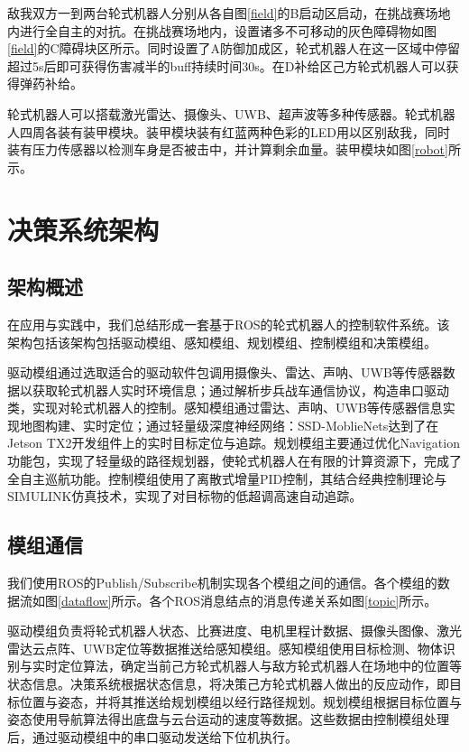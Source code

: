 敌我双方一到两台轮式机器人分别从各自图\ref{field}的B启动区启动，在挑战赛场地内进行全自主的对抗。在挑战赛场地内，设置诸多不可移动的灰色障碍物如图\ref{field}的C障碍块区所示。同时设置了A防御加成区，轮式机器人在这一区域中停留超过5s后即可获得伤害减半的buff持续时间30s。在D补给区己方轮式机器人可以获得弹药补给。

轮式机器人可以搭载激光雷达、摄像头、UWB、超声波等多种传感器。轮式机器人四周各装有装甲模块。装甲模块装有红蓝两种色彩的LED用以区别敌我，同时装有压力传感器以检测车身是否被击中，并计算剩余血量。装甲模块如图\ref{robot}所示。

\section{决策系统架构}
\subsection{架构概述}\label{system}
在应用与实践中，我们总结形成一套基于ROS的轮式机器人的控制软件系统。该架构包括该架构包括驱动模组、感知模组、规划模组、控制模组和决策模组。

驱动模组通过选取适合的驱动软件包调用摄像头、雷达、声呐、UWB等传感器数据以获取轮式机器人实时环境信息；通过解析步兵战车通信协议，构造串口驱动类，实现对轮式机器人的控制。感知模组通过雷达、声呐、UWB等传感器信息实现地图构建、实时定位；通过轻量级深度神经网络：SSD-MoblieNets达到了在Jetson TX2开发组件上的实时目标定位与追踪。规划模组主要通过优化Navigation功能包，实现了轻量级的路径规划器，使轮式机器人在有限的计算资源下，完成了全自主巡航功能。控制模组使用了离散式增量PID控制，其结合经典控制理论与SIMULINK仿真技术，实现了对目标物的低超调高速自动追踪。

\subsection{模组通信}
我们使用ROS的Publish/Subscribe机制实现各个模组之间的通信。各个模组的数据流如图\ref{dataflow}所示。各个ROS消息结点的消息传递关系如图\ref{topic}所示。

驱动模组负责将轮式机器人状态、比赛进度、电机里程计数据、摄像头图像、激光雷达云点阵、UWB定位等数据推送给感知模组。感知模组使用目标检测、物体识别与实时定位算法，确定当前己方轮式机器人与敌方轮式机器人在场地中的位置等状态信息。决策系统根据状态信息，将决策己方轮式机器人做出的反应动作，即目标位置与姿态，并将其推送给规划模组以经行路径规划。规划模组根据目标位置与姿态使用导航算法得出底盘与云台运动的速度等数据。这些数据由控制模组处理后，通过驱动模组中的串口驱动发送给下位机执行。

